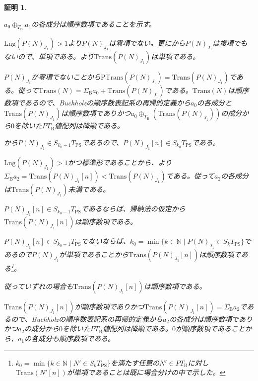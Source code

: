 \documentclass[dvipdfmx,uplatex]{jsarticle}
\theoremstyle{customnonumberbreakfortheorem}
\theoremstyle{customnonumberbreakforproof}
\newtheorem{hideableproof}{証明}
\begin{document}
\begin{hideableproof}
\begin{indented}
\begin{indented}
\begin{indented}
				\item
				\item \(a_0 \oplus_{T_{\textrm{B}}} a_1\)の各成分は順序数項であることを示す。
				\item \(\textrm{Lng}(P(N)_{J_1}) > 1\)より\(P(N)_{J_1}\)は零項でない。更にから\(P(N)_{J_1}\)は複項でもないので、単項である。より\(\textrm{Trans}(P(N)_{J_1})\)は単項である。
				\item \(P(N)_{J_1}\)が零項でないことから\(\textrm{PTrans}(P(N)_{J_1}) = \textrm{Trans}(P(N)_{J_1})\)である。従って\(\textrm{Trans}(N) = \Sigma_{\textrm{B}} a_0 + \textrm{Trans}(P(N)_{J_1})\)である。\(\textrm{Trans}(N)\)は順序数項であるので、Buchholzの順序数表記系の再帰的定義から\(a_0\)の各成分と\(\textrm{Trans}(P(N)_{J_1})\)は順序数項でありかつ\(a_0 \oplus_{T_{\textrm{B}}} (\textrm{Trans}(P(N)_{J_1}))\)の成分から\(0\)を除いた\(PT_{\textrm{B}}\)値配列は降順である。
				\item {}から\(P(N)_{J_1} \in S_{k_0-1}T_{\textrm{PS}}\)であるので、\(P(N)_{J_1}[n] \in S_{k_0}T_{\textrm{PS}}\)である。
				\item \(\textrm{Lng}(P(N)_{J_1}) > 1\)かつ標準形であることから、より\(\Sigma_{\textrm{B}} a_2 = \textrm{Trans}(P(N)_{J_1}[n]) < \textrm{Trans}(P(N)_{J_1})\)である。従って\(a_2\)の各成分は\(\textrm{Trans}(P(N)_{J_1})\)未満である。
				\item \(P(N)_{J_1}[n] \in S_{k_0-1}T_{\textrm{PS}}\)であるならば、帰納法の仮定から\(\textrm{Trans}(P(N)_{J_1}[n])\)は順序数項である。
				\item \(P(N)_{J_1}[n] \in S_{k_0-1}T_{\textrm{PS}}\)でないならば、\(k_0 = \min \{k \in \mathbb{N} \mid P(N)_{J_1} \in S_kT_{\textrm{PS}}\}\)であるので\(P(N)_{J_1}\)が単項であることから\(\textrm{Trans}(P(N)_{J_1}[n])\)は順序数項である\footnote{\(k_0 = \min \{k \in \mathbb{N} \mid N' \in S_kT_{\textrm{PS}}\}\)を満たす任意の\(N' \in PT_{\textrm{B}}\)に対し\(\textrm{Trans}(N'[n])\)が単項であることは既に場合分けの中で示した。}。
				\item 従っていずれの場合も\(\textrm{Trans}(P(N)_{J_1}[n])\)は順序数項である。
				\item \(\textrm{Trans}(P(N)_{J_1}[n])\)が順序数項でありかつ\(\textrm{Trans}(P(N)_{J_1}[n]) = \Sigma_{\textrm{B}} a_2\)であるので、Buchholzの順序数表記系の再帰的定義から\(a_2\)の各成分は順序数項でありかつ\(a_2\)の成分から\(0\)を除いた\(PT_{\textrm{B}}\)値配列は降順である。\(0\)が順序数項であることから、\(a_1\)の各成分も順序数項である。

\end{indented}
\end{indented}
\end{indented}
\end{hideableproof}
\end{document}

